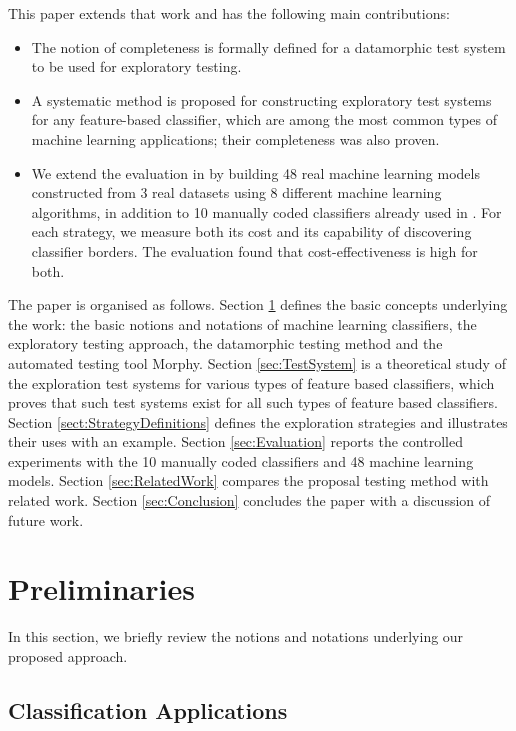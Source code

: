 \documentclass[preprint,1p,authoryear,times]{elsarticle}
\begin{document}
This paper extends that work and has the following main contributions: 
\begin{itemize}
\item The notion of completeness is formally defined for a datamorphic test system to be used for exploratory testing. 
\item A systematic method is proposed for constructing exploratory test systems for any feature-based classifier, which are among the most common types of machine learning applications; their completeness was also proven. 
\item We extend the evaluation in \citep{AST2020} by building 48 real machine learning models constructed from 3 real datasets using 8 different machine learning algorithms, in addition to 10 manually coded classifiers already used in \citep{AST2020}. For each strategy, we measure both its cost and its capability of discovering classifier borders. The evaluation found that cost-effectiveness is high for both. 
\end{itemize}

The paper is organised as follows. Section \ref{sec:Preliminaries} defines the basic concepts underlying the work: the basic notions and notations of machine learning classifiers, the exploratory testing approach, the datamorphic testing method and the automated testing tool Morphy. Section \ref{sec:TestSystem} is a theoretical study of the exploration test systems for various types of feature based classifiers, which proves that such test systems exist for all such types of feature based classifiers. Section \ref{sect:StrategyDefinitions} defines the exploration strategies and illustrates their uses with an example. Section \ref{sec:Evaluation} reports the controlled experiments with the 10 manually coded classifiers and 48 machine learning models. Section \ref{sec:RelatedWork} compares the proposal testing method with related work.  
Section \ref{sec:Conclusion} concludes the paper with a discussion of future work. 

\section{Preliminaries}\label{sec:Preliminaries}

In this section, we briefly review the notions and notations underlying our proposed approach. 

\subsection{Classification Applications} 
\end{document}
